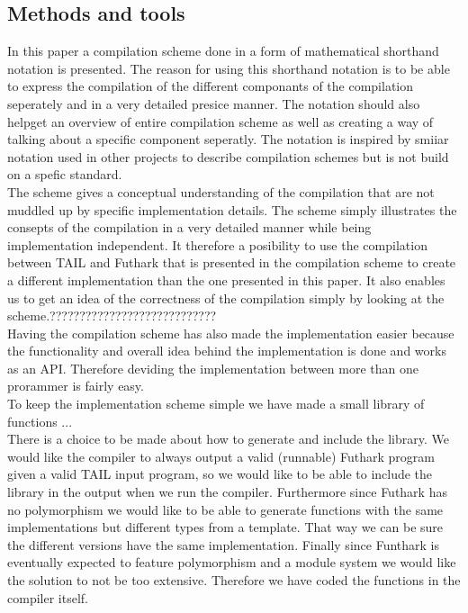 \documentclass[11pt]{article}
\begin{document}

\subsection{Methods and tools}
In this paper a compilation scheme done in a form of mathematical shorthand notation is presented. 
The reason for using this shorthand notation is to be able to express the compilation of the different componants of the compilation seperately and in a very detailed presice manner. 
The notation should also helpget an overview of entire compilation scheme as well as creating a way of talking about a specific component seperatly. The notation is inspired by smiiar notation used in other projects \cite{TorbenMogensen}\cite{MartinElsmanNotation} to describe compilation schemes but is not build on a spefic standard. \\

The scheme gives a conceptual understanding of the compilation that are not muddled up by specific implementation details. The scheme simply illustrates the consepts of the compilation in a very detailed manner while being implementation independent. It therefore a posibility to use the compilation between TAIL and Futhark that is presented in the compilation scheme to create a different implementation than the one presented in this paper.
It also enables us to get an idea of the correctness of the compilation simply by looking at the scheme.????????????????????????????\\

Having the compilation scheme has also made the implementation easier because the functionality and overall idea behind the implementation is done and works as an API. Therefore deviding the implementation between more than one prorammer is fairly easy. \\

To keep the implementation scheme simple we have made a small library of functions ...\\ %
There is a choice to be made about how to generate and include the library.
We would like the compiler to always output a valid (runnable) Futhark program given a valid TAIL input program, so we would like to
be able to include the library in the output when we run the compiler.
Furthermore since Futhark has no polymorphism we would like to be able to
generate functions with the same implementations but different types from a template.
That way we can be sure the different versions have the same implementation.
Finally since Funthark is eventually expected to feature polymorphism and a module system we would like the solution to not be too
extensive\cite{TroelsHenriksen}. Therefore we have coded the functions in the compiler itself.
\end{document}
